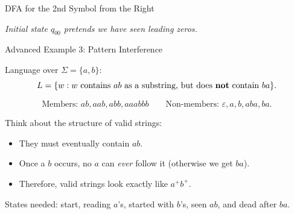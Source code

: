 \documentclass[10pt,aspectratio=169]{beamer}
\newcommand{\eps}{\varepsilon}
\begin{document}
\begin{frame}{DFA for the 2nd Symbol from the Right}

\begin{center}
\end{center}

\vspace{0.5em}
\scriptsize{\textit{Initial state $q_{00}$ pretends we have seen leading zeros.}}

\end{frame}

\begin{frame}{Advanced Example 3: Pattern Interference}

Language over $\Sigma = \{a, b\}$:
\[
L=\{w : w\text{ contains } ab \text{ as a substring, but does \textbf{not} contain } ba\}.
\]

\[
\text{Members: }ab,aab,abb,aaabbb
\qquad
\text{Non-members: }\eps,a,b,aba,ba.
\]


Think about the structure of valid strings:
\begin{itemize}
\item They must eventually contain $ab$.
\item Once a $b$ occurs, no $a$ can \textit{ever} follow it (otherwise we get $ba$).
\item Therefore, valid strings look exactly like $a^+ b^+$.
\end{itemize}

States needed: start, reading $a$'s, started with $b$'s, seen $ab$, and dead after $ba$.

\end{frame}
\end{document}
